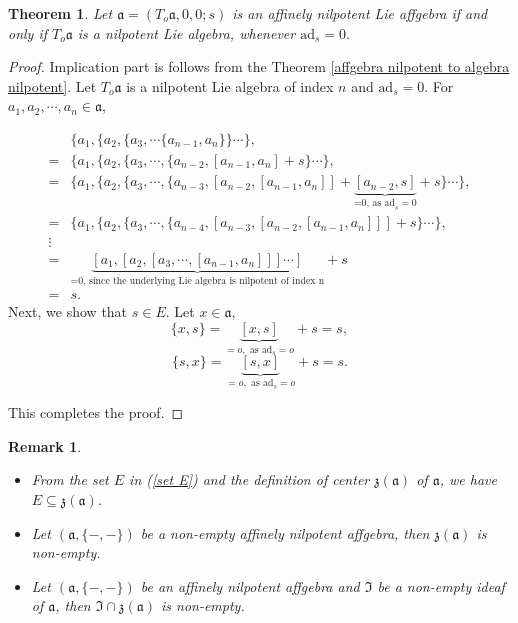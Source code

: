 \documentclass{article}
\newtheorem{remark}{Remark}[section]
\newtheorem{theorem}{Theorem}[section]
\theoremstyle{definition}
\theoremstyle{remark}
\theoremstyle{plain}
\begin{document}

\begin{theorem}
    Let $\mathfrak{a}=(T_o\mathfrak{a}, 0, 0; s)$ is an affinely nilpotent Lie affgebra if and only if $T_o\mathfrak{a}$ is a nilpotent Lie algebra, whenever $\text{ad}_s=0.$
\end{theorem}
\begin{proof}
    Implication part is follows from the Theorem \ref{affgebra nilpotent to algebra nilpotent}.
    Let $T_o\mathfrak{a}$ is a nilpotent Lie algebra of index $n$ and $\text{ad}_s=0.$ 
    For $a_1, a_2, \cdots, a_n \in \mathfrak{a}$, 
    
\begin{align*}
    &\{a_1, \{a_2,\{a_3,\cdots \{a_{n-1}, a_n\}\}\cdots\},\\
    =&\{a_1, \{a_2,\{a_3,\cdots, \{a_{n-2} ,[a_{n-1}, a_n]+s\}\cdots\},\\
    =&\{a_1, \{a_2,\{a_3,\cdots, \{a_{n-3}, [a_{n-2} ,[a_{n-1}, a_n]]+\underbrace{[a_{n-2},s]}_{\text{=0, as ad}_s=0}+s\}\cdots\},\\
    =& \{a_1, \{a_2,\{a_3,\cdots,\{a_{n-4}, [a_{n-3}, [a_{n-2} ,[a_{n-1}, a_n]]]+s\} \cdots\},\\
    \vdots\\
    =& \underbrace{[a_1, [a_2, [a_3,\cdots, [a_{n-1}, a_{n}]]]\cdots]}_{\text{=0, since the underlying Lie algebra is nilpotent of index n} }+s\\
    =& s.
\end{align*}
Next, we show that $s\in E.$ Let $x\in \mathfrak{a}$, $$\{x,s\}=\underbrace{[x,s]}_{=o,\text{ as ad}_s=o} +s=s,$$ 
$$\{s, x\}=\underbrace{[s,x]}_{=o,\text{ as ad}_s=o}+s=s.$$

This completes the proof.
\end{proof}
\begin{remark}
\begin{itemize}
\item[(i)] From the set $E$ in (\ref{set E}) and the definition of center $\mathfrak{z(\mathfrak{a})}$ of $\mathfrak{a}$, we have $E\subseteq \mathfrak{z(\mathfrak{a})}$.

\item[(ii)] Let $(\mathfrak{a},\{-,-\})$ be a non-empty affinely nilpotent affgebra, then $\mathfrak{z(\mathfrak{a})}$ is non-empty.

\item[(iii)]
Let $(\mathfrak{a},\{-,-\})$ be an affinely nilpotent affgebra and $\mathfrak{I}$ be a non-empty ideaf of $\mathfrak{a}$, then $\mathfrak{I}\cap \mathfrak{z(\mathfrak{a})}$ is non-empty.
\end{itemize}
\end{remark}
\end{document}
